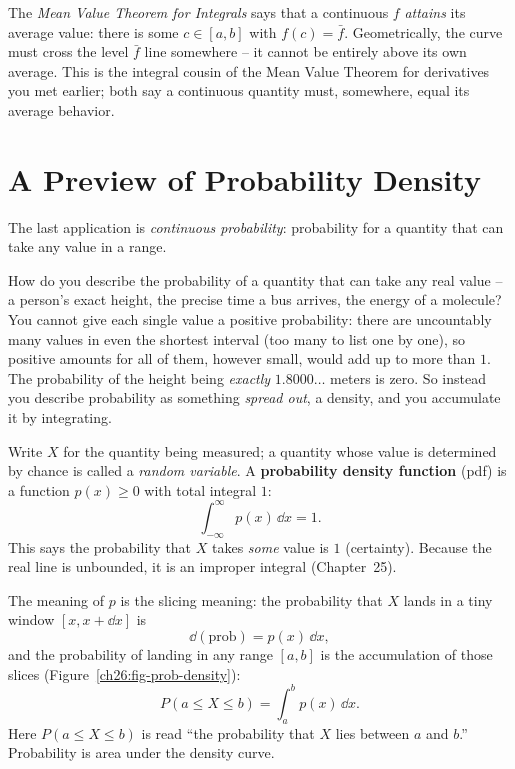 \begin{connectionbox}
The \emph{Mean Value Theorem for Integrals} says that a continuous $f$
\emph{attains} its average value: there is some $c\in[a,b]$ with $f(c)=\bar f$.
Geometrically, the curve must cross the level $\bar f$ line somewhere -- it cannot
be entirely above its own average. This is the integral cousin of the Mean Value
Theorem for derivatives you met earlier; both say a continuous quantity must,
somewhere, equal its average behavior.
\end{connectionbox}

\section{A Preview of Probability Density}
\label{ch26:probability}

The last application is \emph{continuous probability}: probability for a quantity
that can take any value in a range.

How do you describe the probability of a quantity that can take any real value --
a person's exact height, the precise time a bus arrives, the energy of a molecule?
You cannot give each single value a positive probability: there are uncountably many
values in even the shortest interval (too many to list one by one), so positive amounts
for all of them, however small, would add up to more than $1$. The probability of the height
being \emph{exactly} $1.8000\ldots$ meters is zero. So instead you describe
probability as something \emph{spread out}, a density, and you accumulate it by
integrating.

Write $X$ for the quantity being measured; a quantity whose value is determined by
chance is called a \emph{random variable}. A \textbf{probability density function}
(pdf) is a function $p(x) \ge 0$ with total integral $1$:
\[
  \int_{-\infty}^{\infty} p(x)\,\dd x = 1.
\]
This says the probability that $X$ takes \emph{some} value is $1$ (certainty).
Because the real line is unbounded, it is an improper integral (Chapter~25).

The meaning of $p$ is the slicing meaning: the probability that $X$
lands in a tiny window $[x, x+\dd x]$ is
\[
  \dd(\text{prob}) = p(x)\,\dd x,
\]
and the probability of landing in any range $[a,b]$ is the accumulation of those
slices (Figure~\ref{ch26:fig-prob-density}):
\[
  \boxed{\,P(a \le X \le b) = \int_a^b p(x)\,\dd x.\,}
\]
Here $P(a \le X \le b)$ is read ``the probability that $X$ lies between $a$ and
$b$.'' Probability is area under the density curve.

